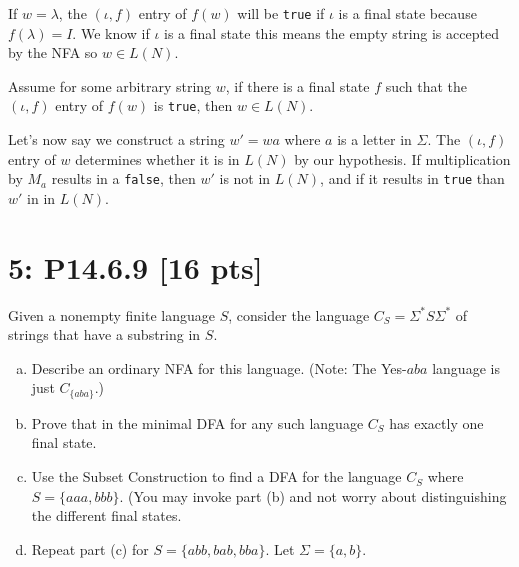 \documentclass[12pt]{article}
\begin{document}
If $w = \lambda$, the $(\iota, f)$ entry of $f(w)$ will be \texttt{true} if $\iota$ is a final state because $f(\lambda) = I$. We know if $\iota$ is a final state this means the empty string is accepted by the NFA so $w \in L(N)$.

Assume for some arbitrary string $w$, if there is a final state $f$ such that the $(\iota, f)$ entry of $f(w)$ is \texttt{true}, then $w \in L(N)$.

Let's now say we construct a string $w' = wa$ where $a$ is a letter in $\Sigma$. The $(\iota, f)$ entry of $w$ determines whether it is in $L(N)$ by our hypothesis. If multiplication by $M_a$ results in a \texttt{false}, then $w'$ is not in $L(N)$, and if it results in \texttt{true} than $w'$ in in $L(N)$.


\newpage
\section*{\textbf{5: P14.6.9} [16 pts]}
Given a nonempty finite language $S$, consider the language $C_S = \Sigma^*S\Sigma^*$ of strings that have a substring in $S$.

\begin{enumerate}[(a)]
    \item Describe an ordinary NFA for this language. (Note: The Yes-$aba$ language is just $C_{\{aba\}}$.)
    \item Prove that in the minimal DFA for any such language $C_S$ has exactly one final state.
    \item Use the Subset Construction to find a DFA for the language $C_S$ where $S = \{aaa, bbb\}$. (You may invoke part (b) and not worry about distinguishing the different final states.
    \item Repeat part (c) for $S = \{abb, bab, bba\}$. Let $\Sigma = \{a, b\}$.
\end{enumerate}
\end{document}
